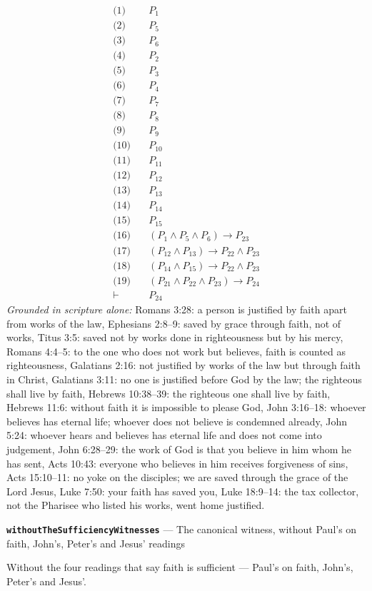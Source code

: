 \documentclass[11pt]{article}
\begin{document}
\begin{align*}
  \text{(1)} \quad & P_{1} \\
  \text{(2)} \quad & P_{5} \\
  \text{(3)} \quad & P_{6} \\
  \text{(4)} \quad & P_{2} \\
  \text{(5)} \quad & P_{3} \\
  \text{(6)} \quad & P_{4} \\
  \text{(7)} \quad & P_{7} \\
  \text{(8)} \quad & P_{8} \\
  \text{(9)} \quad & P_{9} \\
  \text{(10)} \quad & P_{10} \\
  \text{(11)} \quad & P_{11} \\
  \text{(12)} \quad & P_{12} \\
  \text{(13)} \quad & P_{13} \\
  \text{(14)} \quad & P_{14} \\
  \text{(15)} \quad & P_{15} \\
  \text{(16)} \quad & (P_{1} \land P_{5} \land P_{6}) \rightarrow P_{23} \\
  \text{(17)} \quad & (P_{12} \land P_{13}) \rightarrow P_{22} \land P_{23} \\
  \text{(18)} \quad & (P_{14} \land P_{15}) \rightarrow P_{22} \land P_{23} \\
  \text{(19)} \quad & (P_{21} \land P_{22} \land P_{23}) \rightarrow P_{24} \\
  \vdash \quad & P_{24}
\end{align*}
\emph{Grounded in scripture alone:} Romans 3:28: a person is justified by faith apart from works of the law, Ephesians 2:8–9: saved by grace through faith, not of works, Titus 3:5: saved not by works done in righteousness but by his mercy, Romans 4:4–5: to the one who does not work but believes, faith is counted as righteousness, Galatians 2:16: not justified by works of the law but through faith in Christ, Galatians 3:11: no one is justified before God by the law; the righteous shall live by faith, Hebrews 10:38–39: the righteous one shall live by faith, Hebrews 11:6: without faith it is impossible to please God, John 3:16–18: whoever believes has eternal life; whoever does not believe is condemned already, John 5:24: whoever hears and believes has eternal life and does not come into judgement, John 6:28–29: the work of God is that you believe in him whom he has sent, Acts 10:43: everyone who believes in him receives forgiveness of sins, Acts 15:10–11: no yoke on the disciples; we are saved through the grace of the Lord Jesus, Luke 7:50: your faith has saved you, Luke 18:9–14: the tax collector, not the Pharisee who listed his works, went home justified.
\par\medskip\noindent\textbf{\texttt{without\allowbreak{}The\allowbreak{}Sufficiency\allowbreak{}Witnesses}} --- The canonical witness, without Paul's on faith, John's, Peter's and Jesus' readings\par\nobreak\noindent
Without the four readings that say faith is sufficient — Paul's on faith, John's, Peter's and Jesus'.
\end{document}

